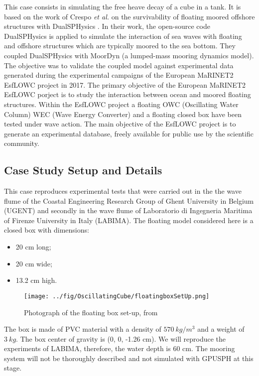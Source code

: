 \documentclass{../GPUSPHtemplate}
\begin{document}
This case consists in simulating the free heave decay of a cube in a
tank. It is based on the work of Crespo \textit{et al.} on
the survivability of floating moored offshore structures with DualSPHysics
\cite{CubeExp}. In their work, the open-source code DualSPHysics is applied
to simulate the interaction of sea waves with floating and offshore
structures which are typically moored to the sea bottom.
They coupled DualSPHysics with MoorDyn (a lumped-mass mooring dynamics model).
The objective was to validate the coupled model against experimental data
generated during the experimental campaigns of the European MaRINET2 EsfLOWC
project in 2017.
The primary objective of the European MaRINET2 EsfLOWC porject is to study
the interaction between ocean and moored floating structures.
Within the EsfLOWC project a floating OWC (Oscillating Water Column)
WEC (Wave Energy Converter) and a floating closed box have been tested
under wave action. The main objective of the EsfLOWC project is to generate
an experimental database, freely available for public use by the
scientific community.

\subsection{Case Study Setup and Details}

This case reproduces experimental tests that were carried out in the the wave flume of the Coastal
Engineering Research Group of Ghent University in Belgium (UGENT) and
secondly in the wave flume of Laboratorio di Ingegneria Maritima of Firenze
University in Italy (LABIMA). The floating model considered here is a closed
box with dimensions:
\begin{itemize}
  \item 20 cm long;
  \item 20 cm wide;
  \item 13.2 cm high.
\end{itemize}

\begin{figure}[H]
    \centering
    \texttt{[image: ../fig/OscillatingCube/floatingboxSetUp.png]}
    \caption{Photograph of the floating box set-up, from \cite{CubeExp}}
    \label{fig:picturesetup}
\end{figure}
The box is made of PVC material with a density of $570\ kg/m^3$ and a weight of
$3\ kg$. The box center of gravity is (0, 0, -1.26 cm). We will reproduce the
experiments of LABIMA, therefore, the water depth is 60 cm.
The mooring system will not be thoroughly described and not simulated
with GPUSPH at this stage.
\end{document}
